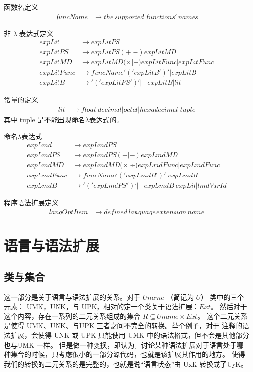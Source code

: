 \documentclass{ctexart}
\begin{document}
函数名定义
\begin{align*}
funcName &\rightarrow \mathit{the\,supported\,functions'\,names}
\end{align*}

非 $\lambda$ 表达式定义
\begin{align*}
expLit &\rightarrow expLitPS \\
expLitPS &\rightarrow expLitPS (+|-) expLitMD \\
expLitMD &\rightarrow expLitMD (\times|\div) expLitFunc | expLitFunc \\
expLitFunc &\rightarrow funcName'('expLitB')' | expLitB \\
expLitB &\rightarrow '('expLitPS')' | -expLitB | lit
\end{align*}

常量的定义
\begin{align*}
lit &\rightarrow float|decimal|octal|hexadecimal|tuple
\end{align*}
其中 tuple 是不能出现命名$\lambda$表达式的。

命名$\lambda$表达式
\begin{align*}
expLmd &\rightarrow expLmdPS \\
expLmdPS &\rightarrow expLmdPS (+|-) expLmdMD \\
expLmdMD &\rightarrow expLmdMD (\times|\div) expLmdFunc | expLmdFunc \\
expLmdFunc &\rightarrow funcName'('expLmdB')' | expLmdB \\
expLmdB &\rightarrow '('expLmdPS')' | -expLmdB | expLit | lmdVarId
\end{align*}

程序语法扩展定义
\begin{align*}
langOptItem &\rightarrow \mathit{defined\,language\,extension\,name}
\end{align*}

\section{语言与语法扩展}
\label{sec:languageextension}

\subsection{类与集合}
\label{sec:langexte:classNset}

这一部分是关于语言与语法扩展的关系。对于 $Uname$ （简记为 $U$） 类中的三个元素： UMK，UNK，与 UPK，相对的定一个类关于语法扩展：$Ext$。
然后对于这个内容，存在一系列的二元关系组成的集合 $ R \subseteq Uname \times Ext $。 这个二元关系是使得 UMK、UNK、与UPK
三者之间不完全的转换。举个例子，对于 注释的语法扩展，会使得 UNK 或 UPK 只能使用 UMK 中的语法格式，但不会是其他部分也与UMK 一样。
但是做一种变换，即认为，讨论某种语法扩展对于语言处于哪种集合的时候，只考虑很小的一部分源代码，也就是该扩展其作用的地方。
使得 我们的转换的二元关系的是完整的，也就是说“语言状态”由 UxK 转换成了UyK。
\end{document}
